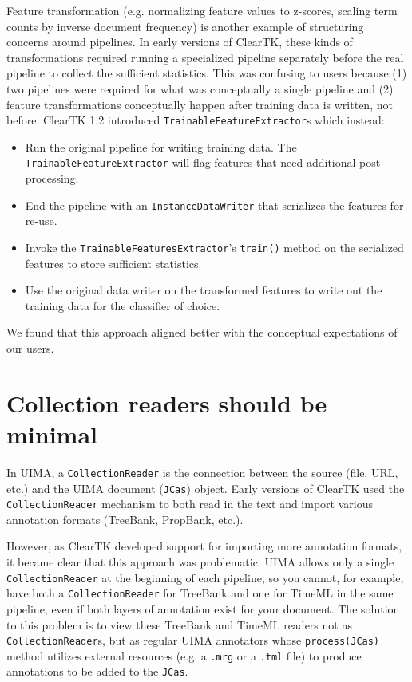 \documentclass[10pt, a4paper]{article}
\newcommand{\code}[1]{\texttt{\small #1}}
\begin{document}
Feature transformation (e.g. normalizing feature values to z-scores, scaling term counts by inverse document frequency) is another example of structuring concerns around pipelines.
In early versions of ClearTK, these kinds of transformations required running a specialized pipeline separately before the real pipeline to collect the sufficient statistics.
This was confusing to users because (1) two pipelines were required for what was conceptually a single pipeline and (2) feature transformations conceptually happen after training data is written, not before.
ClearTK 1.2 introduced \code{TrainableFeatureExtractor}s which instead:
\begin{itemize}
\item Run the original pipeline for writing training data. The \code{TrainableFeatureExtractor} will flag features that need additional post-processing.
\item End the pipeline with an \code{InstanceDataWriter} that serializes the features for re-use.
\item Invoke the \code{TrainableFeaturesExtractor}'s \code{train()} method on the serialized features to store sufficient statistics.
\item Use the original data writer on the transformed features to write out the training data for the classifier of choice.
\end{itemize}
We found that this approach aligned better with the conceptual expectations of our users.


\section{Collection readers should be minimal}
In UIMA, a \code{CollectionReader} is the connection between the source (file, URL, etc.) and the UIMA document (\code{JCas}) object.
Early versions of ClearTK used the \code{CollectionReader} mechanism to both read in the text and import various annotation formats (TreeBank, PropBank, etc.).

However, as ClearTK developed support for importing more annotation formats, it became clear that this approach was problematic.
UIMA allows only a single \code{CollectionReader} at the beginning of each pipeline, so you cannot, for example, have both a \code{CollectionReader} for TreeBank and one for TimeML in the same pipeline, even if both layers of annotation exist for your document.
The solution to this problem is to view these TreeBank and TimeML readers not as \code{CollectionReader}s, but as regular UIMA annotators whose \code{process(JCas)} method utilizes external resources (e.g. a \code{.mrg} or a \code{.tml} file) to produce annotations to be added to the \code{JCas}.
\end{document}
